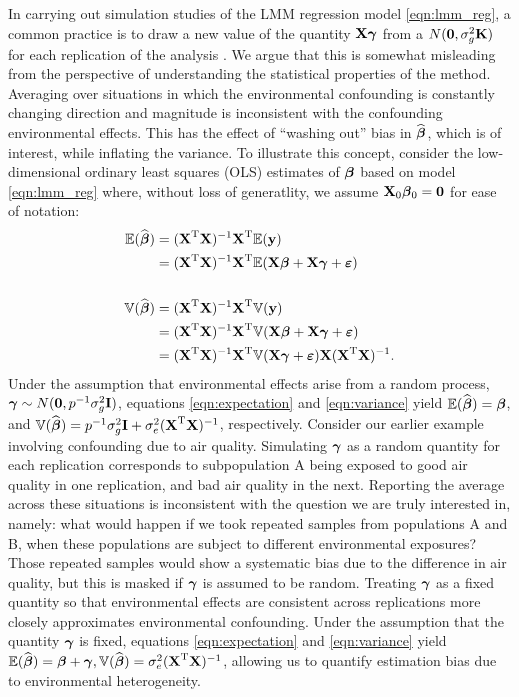 In carrying out simulation studies of the LMM regression model \eqref{eqn:lmm_reg}, a common practice is to draw a new value of the quantity $\textbf{X}\boldsymbol{\gamma}$ from a $N(\boldsymbol{0}, \sigma^2_g \textbf{K})$ for each replication of the analysis \citep{Rakitsch2012, bhatnagar2019simultaneous}.  We argue that this is somewhat misleading from the perspective of understanding the statistical properties of the method. Averaging over situations in which the environmental confounding is constantly changing direction and magnitude is inconsistent with the confounding environmental effects. This has the effect of ``washing out'' bias in $\widehat{\boldsymbol{\beta}{}}$, which is of interest, while inflating the variance. To illustrate this concept, consider the low-dimensional ordinary least squares (OLS) estimates of $\boldsymbol{\beta}{}$ based on model \eqref{eqn:lmm_reg} where, without loss of generatlity, we assume $\textbf{X}_0 \boldsymbol{\beta}{}_0 = \boldsymbol{0}$ for ease of notation: 
\begin{align}
    \mathbb{E}(\widehat{\boldsymbol{\beta}{}}) &= (\textbf{X}^{\text{T}} \textbf{X})^{-1} \textbf{X}^{\text{T}} \mathbb{E}(\textbf{y}) \notag \\
    &=  (\textbf{X}^{\text{T}} \textbf{X})^{-1} \textbf{X}^{\text{T}} \mathbb{E}(\textbf{X}\boldsymbol{\beta}{} + \textbf{X}\boldsymbol{\gamma} + \boldsymbol{\varepsilon}{}) \label{eqn:expectation}\\
    &\quad \notag\\
    \mathbb{V}(\widehat{\boldsymbol{\beta}{}}) &= (\textbf{X}^{\text{T}} \textbf{X})^{-1} \textbf{X}^{\text{T}} \mathbb{V}(\textbf{y}) \notag\\
    &=  (\textbf{X}^{\text{T}} \textbf{X})^{-1} \textbf{X}^{\text{T}} \mathbb{V}(\textbf{X}\boldsymbol{\beta}{} + \textbf{X}\boldsymbol{\gamma} + \boldsymbol{\varepsilon}{}) \notag\\
    &=  (\textbf{X}^{\text{T}} \textbf{X})^{-1} \textbf{X}^{\text{T}} \mathbb{V}(\textbf{X}\boldsymbol{\gamma} + \boldsymbol{\varepsilon}{}) \textbf{X}  (\textbf{X}^{\text{T}} \textbf{X})^{-1} \label{eqn:variance}.
\end{align}
Under the assumption that environmental effects arise from a random process, $\boldsymbol{\gamma} \sim N(\boldsymbol{0}, p^{-1} \sigma^2_g \textbf{I})$, equations \eqref{eqn:expectation} and \eqref{eqn:variance} yield $\mathbb{E}(\widehat{\boldsymbol{\beta}{}}) = \boldsymbol{\beta}{}$, and $\mathbb{V}(\widehat{\boldsymbol{\beta}{}}) = p^{-1}\sigma^2_g\textbf{I} + \sigma^2_e (\textbf{X}^{\text{T}} \textbf{X})^{-1}$, respectively. Consider our earlier example involving confounding due to air quality. Simulating $\boldsymbol{\gamma}$ as a random quantity for each replication corresponds to subpopulation A being exposed to good air quality in one replication, and bad air quality in the next. Reporting the average across these situations is inconsistent with the question we are truly interested in, namely: what would happen if we took repeated samples from populations A and B, when these populations are subject to different environmental exposures? Those repeated samples would show a systematic bias due to the difference in air quality, but this is masked if $\boldsymbol{\gamma}$ is assumed to be random. Treating $\boldsymbol{\gamma}$ as a fixed quantity so that environmental effects are consistent across replications more closely approximates environmental confounding. Under the assumption that the quantity $\boldsymbol{\gamma}$ is fixed, equations \eqref{eqn:expectation} and \eqref{eqn:variance} yield $\mathbb{E}(\widehat{\boldsymbol{\beta}{}}) = \boldsymbol{\beta}{} + \boldsymbol{\gamma}, \mathbb{V}(\widehat{\boldsymbol{\beta}{}}) = \sigma^2_e (\textbf{X}^{\text{T}} \textbf{X})^{-1}$, allowing us to quantify estimation bias due to environmental heterogeneity. 

